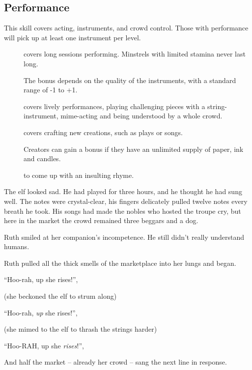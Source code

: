 \begin{multicols}{2}
\subsection{Performance}

This skill covers acting, instruments, and crowd control.
Those with performance will pick up at least one instrument per level.

\begin{description}
  \item[]
    covers long sessions performing.
    Minstrels with limited stamina never last long.

    The bonus depends on the quality of the instruments, with a standard range of -1 to +1.
  \item[]
    covers lively performances, playing challenging pieces with a string-instrument, mime-acting and being understood by a whole crowd.
  \item[]
    covers crafting new creations, such as plays or songs.

    Creators can gain a bonus if they have an unlimited supply of paper, ink and candles.
  \item[]
    to come up with an insulting rhyme.
\end{description}

\begin{exampletext}
  The elf looked sad.
  He had played for three hours, and he thought he had sung well.
  The notes were crystal-clear, his fingers delicately pulled twelve notes every breath he took.
  His songs had made the nobles who hosted the troupe cry, but here in the market the crowd remained three beggars and a dog.

  Ruth smiled at her companion's incompetence.
  He still didn't really understand humans.

  Ruth pulled all the thick smells of the marketplace into her lungs and began.

  ``Hoo-rah, up she rises!'',

  (she beckoned the elf to strum along)

  ``Hoo-rah, \emph{up} she rises!'',

  (she mimed to the elf to thrash the strings harder)

  ``Hoo-RAH, up she \emph{rises}!'',

  And half the market -- already her crowd -- sang the next line in response.


\end{exampletext}
\end{multicols}

